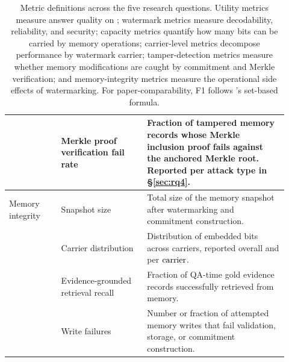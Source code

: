 \begin{table}[t]
\begin{tabular}{p{0.17\linewidth}p{0.29\linewidth}p{0.46\linewidth}}
  & Merkle proof verification fail rate
  & Fraction of tampered memory records whose Merkle inclusion proof fails
    against the anchored Merkle root. Reported per attack type in
    \S\ref{sec:rq4}. \\

\midrule

Memory integrity
  & Snapshot size
  & Total size of the memory snapshot after watermarking and commitment
    construction. \\

  & Carrier distribution
  & Distribution of embedded bits across carriers, reported overall and
    per $\mathrm{carrier}$. \\

  & Evidence-grounded retrieval recall
  & Fraction of QA-time gold evidence records successfully retrieved from
    memory. \\

  & Write failures
  & Number or fraction of attempted memory writes that fail validation,
    storage, or commitment construction. \\

\bottomrule
\end{tabular}
\caption{Metric definitions across the five research questions. Utility
metrics measure answer quality on \locomo{}; watermark metrics measure
decodability, reliability, and security; capacity metrics quantify how many
bits can be carried by memory operations; carrier-level metrics decompose
performance by watermark carrier; tamper-detection metrics measure whether
memory modifications are caught by commitment and Merkle verification; and
memory-integrity metrics measure the operational side effects of watermarking.
For paper-comparability, F1 follows \amem{}'s set-based formula.}
\label{tab:metric-defs}
\end{table}